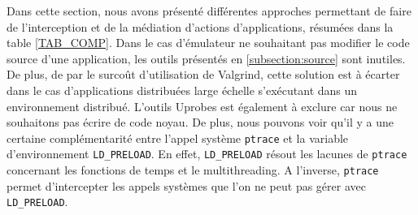 Dans cette section, nous avons présenté différentes approches permettant de
faire de l'interception et de la médiation d'actions d'applications, résumées
dans la table \ref{TAB_COMP}. Dans le cas d'émulateur ne souhaitant pas modifier
le code source d'une application, les outils présentés en \ref{subsection:source}
sont inutiles. De plus, de par le surcoût d'utilisation de Valgrind, cette
solution est à écarter dans le cas d'applications distribuées large échelle
s'exécutant dans un environnement distribué. L'outils Uprobes est également à
exclure car nous ne souhaitons pas écrire de code noyau. De plus, nous pouvons
voir qu'il y a une certaine complémentarité entre l'appel
système \texttt{ptrace} et la variable d'environnement \texttt{LD\_PRELOAD}. En
effet, \texttt{LD\_PRELOAD} résout les lacunes de \texttt{ptrace} concernant les
fonctions de temps et le multithreading. A l'inverse, \texttt{ptrace} permet
d'intercepter les appels systèmes que l'on ne peut pas gérer
avec \texttt{LD\_PRELOAD}.


